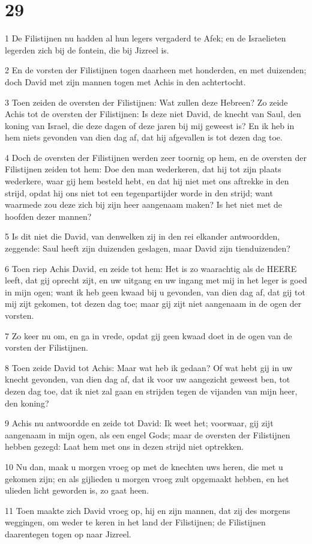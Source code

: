 \chapter{29}

\par 1 De Filistijnen nu hadden al hun legers vergaderd te Afek; en de Israelieten legerden zich bij de fontein, die bij Jizreel is.
\par 2 En de vorsten der Filistijnen togen daarheen met honderden, en met duizenden; doch David met zijn mannen togen met Achis in den achtertocht.
\par 3 Toen zeiden de oversten der Filistijnen: Wat zullen deze Hebreen? Zo zeide Achis tot de oversten der Filistijnen: Is deze niet David, de knecht van Saul, den koning van Israel, die deze dagen of deze jaren bij mij geweest is? En ik heb in hem niets gevonden van dien dag af, dat hij afgevallen is tot dezen dag toe.
\par 4 Doch de oversten der Filistijnen werden zeer toornig op hem, en de oversten der Filistijnen zeiden tot hem: Doe den man wederkeren, dat hij tot zijn plaats wederkere, waar gij hem besteld hebt, en dat hij niet met ons aftrekke in den strijd, opdat hij ons niet tot een tegenpartijder worde in den strijd; want waarmede zou deze zich bij zijn heer aangenaam maken? Is het niet met de hoofden dezer mannen?
\par 5 Is dit niet die David, van denwelken zij in den rei elkander antwoordden, zeggende: Saul heeft zijn duizenden geslagen, maar David zijn tienduizenden?
\par 6 Toen riep Achis David, en zeide tot hem: Het is zo waarachtig als de HEERE leeft, dat gij oprecht zijt, en uw uitgang en uw ingang met mij in het leger is goed in mijn ogen; want ik heb geen kwaad bij u gevonden, van dien dag af, dat gij tot mij zijt gekomen, tot dezen dag toe; maar gij zijt niet aangenaam in de ogen der vorsten.
\par 7 Zo keer nu om, en ga in vrede, opdat gij geen kwaad doet in de ogen van de vorsten der Filistijnen.
\par 8 Toen zeide David tot Achis: Maar wat heb ik gedaan? Of wat hebt gij in uw knecht gevonden, van dien dag af, dat ik voor uw aangezicht geweest ben, tot dezen dag toe, dat ik niet zal gaan en strijden tegen de vijanden van mijn heer, den koning?
\par 9 Achis nu antwoordde en zeide tot David: Ik weet het; voorwaar, gij zijt aangenaam in mijn ogen, als een engel Gods; maar de oversten der Filistijnen hebben gezegd: Laat hem met ons in dezen strijd niet optrekken.
\par 10 Nu dan, maak u morgen vroeg op met de knechten uws heren, die met u gekomen zijn; en als gijlieden u morgen vroeg zult opgemaakt hebben, en het ulieden licht geworden is, zo gaat heen.
\par 11 Toen maakte zich David vroeg op, hij en zijn mannen, dat zij des morgens weggingen, om weder te keren in het land der Filistijnen; de Filistijnen daarentegen togen op naar Jizreel.

